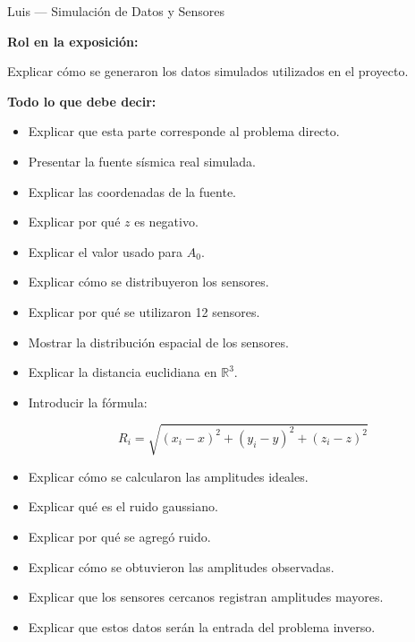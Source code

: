 \documentclass[aspectratio=169]{beamer}
\begin{document}
\begin{frame}{Luis — Simulación de Datos y Sensores}

\textbf{Rol en la exposición:}

Explicar cómo se generaron los datos simulados utilizados en el proyecto.

\vspace{0.4cm}

\textbf{Todo lo que debe decir:}

\begin{itemize}
    \item Explicar que esta parte corresponde al problema directo.
    \item Presentar la fuente sísmica real simulada.
    \item Explicar las coordenadas de la fuente.
    \item Explicar por qué $z$ es negativo.
    \item Explicar el valor usado para $A_0$.
    \item Explicar cómo se distribuyeron los sensores.
    \item Explicar por qué se utilizaron 12 sensores.
    \item Mostrar la distribución espacial de los sensores.
    \item Explicar la distancia euclidiana en $\mathbb{R}^3$.
    \item Introducir la fórmula:
    
    $$
    R_i = \sqrt{(x_i-x)^2+(y_i-y)^2+(z_i-z)^2}
    $$

    \item Explicar cómo se calcularon las amplitudes ideales.
    \item Explicar qué es el ruido gaussiano.
    \item Explicar por qué se agregó ruido.
    \item Explicar cómo se obtuvieron las amplitudes observadas.
    \item Explicar que los sensores cercanos registran amplitudes mayores.
    \item Explicar que estos datos serán la entrada del problema inverso.
\end{itemize}

\end{frame}

\end{document}
